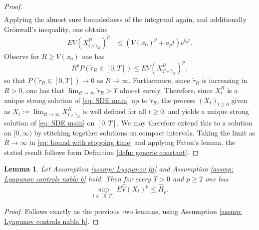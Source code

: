 \documentclass{article}
\newtheorem{lemma}{Lemma}
\begin{document}
\begin{proof}
\begin{align}
    \end{align}
    Applying the almost sure boundedness of the integrand again, and additionally Grönwall's inequality, one obtains
     \begin{align}\label{eq: bound with stopping time}
        EV(X^R_{t\wedge \tilde{\tau}_R})^p&\leq (V(x_0)^p+a_pt)e^{b_p t}.
    \end{align}
Observe for $R\geq V(x_0)$ one has
  \begin{equation}
      R^pP(\tilde{\tau}_R\in [0,T])\leq  EV(X^R_{T\wedge \tilde{\tau}_R})^p,
  \end{equation}
 so that $P(\tilde{\tau}_R\in [0,T])\to 0$ as $R\to \infty$. Furthermore, since $\tilde{\tau}_R$ is increasing in $R>0$, one has that $\lim_{R\to\infty}\tilde{\tau}_R>T$ almost surely. Therefore, since $X^R_t$ is a unique strong solution of \eqref{eq: SDE main} up to $\tilde{\tau}_R$, the process $(X_t)_{t\geq 0}$ given as $X_t:=\lim_{R\to\infty}X^R_{t\wedge \tilde{\tau}_R}$ is well defined for all $t\geq 0$, and yields a unique strong solution of \eqref{eq: SDE main} on $[0,T]$. We may therefore extend this to a solution on $[0,\infty)$ by stitching together solutions on compact intervals. Taking the limit as $R\to\infty$ in \eqref{eq: bound with stopping time} and applying Fatou's lemma, the stated result follows form Definition \ref{defn: generic constant}.
\end{proof}

\begin{lemma}\label{lem: V hat bounds cont uniform}
    Let Assumption \ref{assmp: Lyapunov fn} and Assumption \ref{assmp: Lyapunov controls nabla b} hold. Then for every $T>0$ and $p\geq 2$ one has
    \begin{equation}
\sup_{t\in [0,T]} E\hat{V}(X_t)^p\leq \hat{H}_p.
    \end{equation}
\end{lemma}
\begin{proof}
    Follows exactly as the previous two lemmas, using Assumption \ref{assmp: Lyapunov controls nabla b}.
\end{proof}
\end{document}
